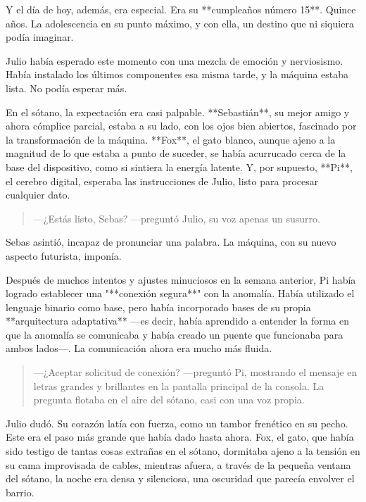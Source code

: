 \documentclass[a4paper,12pt]{book}
\begin{document}
Y el día de hoy, además, era especial. Era su **cumpleaños número 15**. Quince años. La adolescencia en su punto máximo, y con ella, un destino que ni siquiera podía imaginar.

Julio había esperado este momento con una mezcla de emoción y nerviosismo. Había instalado los últimos componentes esa misma tarde, y la máquina estaba lista. No podía esperar más.

En el sótano, la expectación era casi palpable. **Sebastián**, su mejor amigo y ahora cómplice parcial, estaba a su lado, con los ojos bien abiertos, fascinado por la transformación de la máquina. **Fox**, el gato blanco, aunque ajeno a la magnitud de lo que estaba a punto de suceder, se había acurrucado cerca de la base del dispositivo, como si sintiera la energía latente. Y, por supuesto, **Pi**, el cerebro digital, esperaba las instrucciones de Julio, listo para procesar cualquier dato.

\begin{quote}
    —¿Estás listo, Sebas? —preguntó Julio, su voz apenas un susurro.
\end{quote}

Sebas asintió, incapaz de pronunciar una palabra. La máquina, con su nuevo aspecto futurista, imponía.

Después de muchos intentos y ajustes minuciosos en la semana anterior, Pi había logrado establecer una "**conexión segura**" con la anomalía. Había utilizado el lenguaje binario como base, pero había incorporado bases de su propia **arquitectura adaptativa** —es decir, había aprendido a entender la forma en que la anomalía se comunicaba y había creado un puente que funcionaba para ambos lados—. La comunicación ahora era mucho más fluida.

\begin{quote}
    —¿Aceptar solicitud de conexión? —preguntó Pi, mostrando el mensaje en letras grandes y brillantes en la pantalla principal de la consola. La pregunta flotaba en el aire del sótano, casi con una voz propia.
\end{quote}

Julio dudó. Su corazón latía con fuerza, como un tambor frenético en su pecho. Este era el paso más grande que había dado hasta ahora. Fox, el gato, que había sido testigo de tantas cosas extrañas en el sótano, dormitaba ajeno a la tensión en su cama improvisada de cables, mientras afuera, a través de la pequeña ventana del sótano, la noche era densa y silenciosa, una oscuridad que parecía envolver el barrio.
\end{document}
